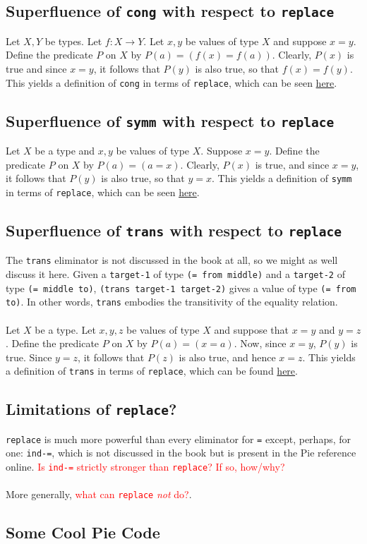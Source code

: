 \documentclass{article}
\newcommand{\ttt}[1]{\texttt{#1}}
\begin{document}
\subsection{Superfluence of \ttt{cong} with respect to \ttt{replace}}
Let \(X, Y\) be types. Let \(f : X \to Y\). Let \(x, y\) be values of type \(X\) and suppose \(x = y\). Define the predicate \(P\) on \(X\) by \(P(a) = (f(x) = f(a))\). Clearly, \(P(x)\) is true and since \(x = y\), it follows that \(P(y)\) is also true, so that \(f(x) = f(y)\). This yields a definition of \ttt{cong} in terms of \ttt{replace}, which can be seen \hyperref[code:replace-can-cong]{here}.
\subsection{Superfluence of \ttt{symm} with respect to \ttt{replace}}
Let \(X\) be a type and \(x, y\) be values of type \(X\). Suppose \(x = y\). Define the predicate \(P\) on \(X\) by \(P(a) = (a = x)\). Clearly, \(P(x)\) is true, and since \(x = y\), it follows that \(P(y)\) is also true, so that \(y = x\). This yields a definition of \ttt{symm} in terms of \ttt{replace}, which can be seen \hyperref[code:replace-can-symm]{here}.
\subsection{Superfluence of \ttt{trans} with respect to \ttt{replace}}
The \ttt{trans} eliminator is not discussed in the book at all, so we might as well discuss it here. Given a \ttt{target-1} of type \ttt{(= from middle)} and a \ttt{target-2} of type \ttt{(= middle to)}, \ttt{(trans target-1 target-2)} gives a value of type \ttt{(= from to)}. In other words, \ttt{trans} embodies the transitivity of the equality relation.
\\ \\
Let \(X\) be a type. Let \(x, y, z\) be values of type \(X\) and suppose that \(x = y\) and \(y = z\). Define the predicate \(P\) on \(X\) by \(P(a) = (x = a)\). Now, since \(x = y\), \(P(y)\) is true. Since \(y = z\), it follows that \(P(z)\) is also true, and hence \(x = z\). This yields a definition of \ttt{trans} in terms of \ttt{replace}, which can be found \hyperref[code:replace-can-trans]{here}.
\subsection{Limitations of \ttt{replace}?}
\ttt{replace} is much more powerful than every eliminator for \ttt{=} except, perhaps, for one: \ttt{ind-=}, which is not discussed in the book but is present in the Pie reference online. \textcolor{red}{Is \ttt{ind-=} strictly stronger than \ttt{replace}? If so, how/why?} 
\\ \\
More generally, \textcolor{red}{what can \ttt{replace} \textit{not} do?}.
\newpage
\begin{appendix}
\section{Some Cool Pie Code} \label{pie-code-appendix}
\renewcommand{\contentsname}{\normalsize Contents}
\localtableofcontents
\newpage\noindent

\end{appendix}
\end{document}
